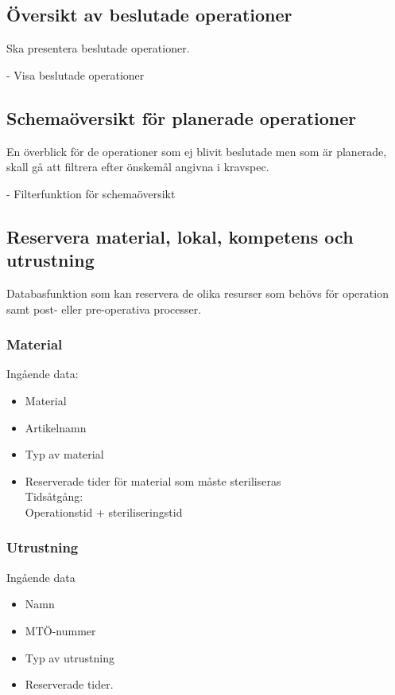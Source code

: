 \documentclass[a4paper,10pt, twoside]{article}
\begin{document}
\subsection{Översikt av beslutade operationer}
\label{sec: Översikt av beslutade operationer}
Ska presentera beslutade operationer.

-	Visa beslutade operationer
\subsection{Schemaöversikt för planerade operationer}
\label{sec: Schemaöversikt för planerade operationer}
En överblick för de operationer som ej blivit beslutade men som är planerade, skall gå att filtrera efter önskemål angivna 
i kravspec.

- Filterfunktion för schemaöversikt

\clearpage
\subsection{Reservera material, lokal, kompetens och utrustning}
\label{sec: Resevera material, lokal, kompetens och utrustning}
Databasfunktion som kan reservera de olika resurser som behövs för operation samt post- eller pre-operativa processer.
\subsubsection{Material}
\label{Material}
Ingående data:
\begin{multicols}{2}
\begin{itemize}
	\item Material
	\item Artikelnamn
	\item Typ av material
	\item Reserverade tider för material som måste steriliseras \\Tidsåtgång: \\ Operationstid + steriliseringstid
\end{itemize}
\end{multicols}

\subsubsection{Utrustning}
\label{sec: Utrustning}
Ingående data
\begin{multicols}{2}
\begin{itemize}
	\item Namn
	\item MTÖ-nummer
	\item Typ av utrustning
	\item Reserverade tider.
\end{itemize}
\end{multicols}
\end{document}
